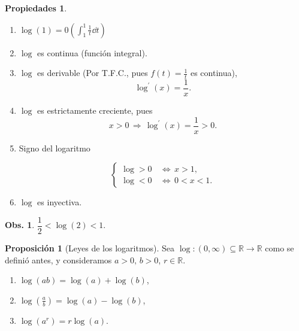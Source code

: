 \documentclass{article}
\theoremstyle{definicion}
\theoremstyle{definition}             %
\theoremstyle{definition}             %
\theoremstyle{definition}
\theoremstyle{definition}
\newtheorem{properties}{Propiedades}
\theoremstyle{observacion}
\newtheorem{obs}{Obs.}
\theoremstyle{definition}
\newtheorem{prop}{Proposición}
\theoremstyle{plain}
\theoremstyle{definition}
\theoremstyle{afirmacion}
\theoremstyle{definition}
\begin{document}
    \begin{properties}
        \vphantom{adfslfjsdlfjdslajfakjfkdlsjfakjfljdaskfjlasdjflkasjfdkajd}
        \begin{enumerate}[label = \roman*)]
            \item \(\log(1) = 0 (\int_{1}^{1}\frac{1}{t}\dd{t})\)
            \item \(\log\) es continua (función integral).
            \item \(\log\) es derivable (Por T.F.C., pues \(f(t) = \frac{1}{t}\) es continua),
                \begin{equation*}
                    \log^{\prime}(x) = \dfrac{1}{x}.        
                \end{equation*}
            \item \(\log\) es estrictamente creciente, pues 
                \begin{equation*}
                    x > 0\, \Rightarrow\, \log^{\prime}(x) = \dfrac{1}{x} > 0.
                \end{equation*}
            
            \item Signo del logaritmo 
            
                \begin{equation*}
                    \begin{cases}
                        \log > 0\, &\Leftrightarrow\, x > 1,\\
                        \log < 0\, &\Leftrightarrow\, 0 < x < 1.
                    \end{cases}
                \end{equation*}

            \item \(\log\) es inyectiva.
        \end{enumerate}
    \end{properties}

    \begin{obs}
        \(\dfrac{1}{2} < \log(2) < 1.\)
    \end{obs}

    \begin{prop}[Leyes de los logaritmos]
        Sea \(\log \colon (0, \infty) \subseteq \mathbb{R} \to \mathbb{R}\) como se definió antes, y consideramos \(a > 0,\, b > 0\), \(r\in\mathbb{R}\).
        
        \begin{enumerate}[label = \roman*)]
            \item \(\log(ab) = \log(a) + \log(b)\),
            \item \(\log(\frac{a}{b}) = \log(a) - \log(b)\),
            \item \(\log(a^{r}) = r\log(a)\).
        \end{enumerate}
    \end{prop}
\end{document}
